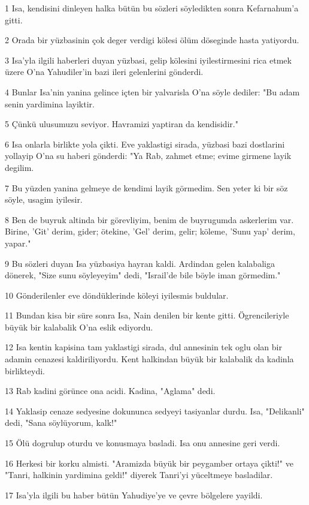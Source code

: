 \par 1 Isa, kendisini dinleyen halka bütün bu sözleri söyledikten sonra Kefarnahum'a gitti.
\par 2 Orada bir yüzbasinin çok deger verdigi kölesi ölüm döseginde hasta yatiyordu.
\par 3 Isa'yla ilgili haberleri duyan yüzbasi, gelip kölesini iyilestirmesini rica etmek üzere O'na Yahudiler'in bazi ileri gelenlerini gönderdi.
\par 4 Bunlar Isa'nin yanina gelince içten bir yalvarisla O'na söyle dediler: "Bu adam senin yardimina layiktir.
\par 5 Çünkü ulusumuzu seviyor. Havramizi yaptiran da kendisidir."
\par 6 Isa onlarla birlikte yola çikti. Eve yaklastigi sirada, yüzbasi bazi dostlarini yollayip O'na su haberi gönderdi: "Ya Rab, zahmet etme; evime girmene layik degilim.
\par 7 Bu yüzden yanina gelmeye de kendimi layik görmedim. Sen yeter ki bir söz söyle, usagim iyilesir.
\par 8 Ben de buyruk altinda bir görevliyim, benim de buyrugumda askerlerim var. Birine, 'Git' derim, gider; ötekine, 'Gel' derim, gelir; köleme, 'Sunu yap' derim, yapar."
\par 9 Bu sözleri duyan Isa yüzbasiya hayran kaldi. Ardindan gelen kalabaliga dönerek, "Size sunu söyleyeyim" dedi, "Israil'de bile böyle iman görmedim."
\par 10 Gönderilenler eve döndüklerinde köleyi iyilesmis buldular.
\par 11 Bundan kisa bir süre sonra Isa, Nain denilen bir kente gitti. Ögrencileriyle büyük bir kalabalik O'na eslik ediyordu.
\par 12 Isa kentin kapisina tam yaklastigi sirada, dul annesinin tek oglu olan bir adamin cenazesi kaldiriliyordu. Kent halkindan büyük bir kalabalik da kadinla birlikteydi.
\par 13 Rab kadini görünce ona acidi. Kadina, "Aglama" dedi.
\par 14 Yaklasip cenaze sedyesine dokununca sedyeyi tasiyanlar durdu. Isa, "Delikanli" dedi, "Sana söylüyorum, kalk!"
\par 15 Ölü dogrulup oturdu ve konusmaya basladi. Isa onu annesine geri verdi.
\par 16 Herkesi bir korku almisti. "Aramizda büyük bir peygamber ortaya çikti!" ve "Tanri, halkinin yardimina geldi!" diyerek Tanri'yi yüceltmeye basladilar.
\par 17 Isa'yla ilgili bu haber bütün Yahudiye'ye ve çevre bölgelere yayildi.
